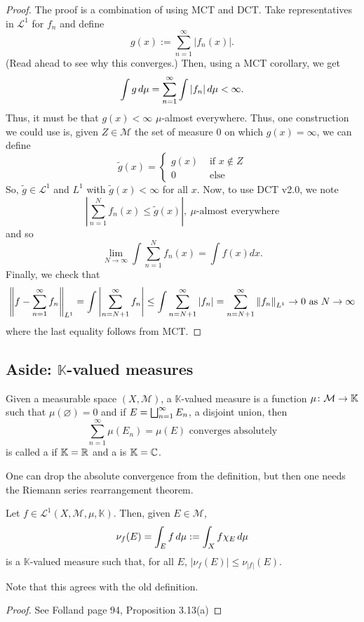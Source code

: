 \documentclass[11pt,leqno,oneside]{amsbook}
\numberwithin{thm}{section}
\newcommand{\M}{\mathcal{M}}
\newcommand{\cL}{\mathcal{L}}
\newcommand{\K}{\mathbb{K}} %
\renewcommand{\emptyset}{\varnothing}
\begin{document}
\begin{proof}
  The proof is a combination of using MCT and DCT. Take representatives
  in \(\cL^1\) for \(f_n\) and define \[
    g(x) := \sum_{n=1}^\infty |f_n(x)|.
  \]
  (Read ahead to see why this converges.) Then, using a MCT corollary, we
  get \[
    \int g \d\mu = \sum_{n=1}^\infty \int |f_n| \d\mu < \infty.
  \]
  Thus, it must be that \(g(x) < \infty\) \(\mu\)-almost everywhere.
  Thus, one construction we could use is, given \(Z \in \M\) the set
  of measure 0 on which \(g(x) = \infty\), we can define \[
    \tilde{g}(x) =
    \begin{cases}
      g(x) & \text{ if } x \not\in Z \\
      0 & \text{ else }
    \end{cases}
  \]
  So, \(\tilde{g} \in \cL^1\) and \(L^1\) with \(\tilde{g}(x) <
  \infty\) for all \(x\). Now, to use DCT v2.0, we note \[
    \left| \sum_{n=1}^N f_n(x) \leq \tilde{g}(x) \right|, \
    \mu\text{-almost everywhere}
  \]
  and so \[
    \lim_{N \to \infty} \int \sum_{n=1}^N f_n(x) = \int f(x) dx.
  \]
  Finally, we check that \[
    \norm[f - \sum_{n=1}^\infty f_n]_{L^1} = \int \left|
      \sum_{n=N+1}^\infty f_n \right| \leq \int \sum_{n=N+1}^\infty
    |f_n| = \sum_{n=N+1}^\infty \norm[f_n]_{L^1} \to 0 \text{ as } N
    \to \infty
  \]
  where the last equality follows from MCT.
\end{proof}
\subsection{Aside: \(\K\)-valued measures}
\begin{defn}
  Given a measurable space \((X,\M)\), a \(\K\)-valued measure is a
  function \(\mu \from \M \to \K\) such that \(\mu(\emptyset) = 0\)
  and if \(E = \Dunion_{n=1}^\infty E_n\), a disjoint union, then \[
    \sum_{n=1}^\infty \mu(E_n) = \mu(E) \text{ converges absolutely}
  \]
  is called a  if \(\K=\R\) and a \de{complex
    measure} is \(\K=\C\).
\end{defn}
\begin{rmk}
  One can drop the absolute convergence from the definition, but then
  one needs the Riemann series rearrangement theorem.
\end{rmk}
\begin{prop}
  Let \(f \in \cL^1(X,\M,\mu,\K)\). Then, given \(E \in \M\), \[
    \nu_f(E) = \int_E f \d\mu := \int_X f \chi_E \d\mu
  \]
  is a \(\K\)-valued measure such that, for all \(E\), \(|\nu_f(E)|
  \leq \nu_{|f|}(E)\).
\end{prop}
Note that this agrees with the old definition.
\begin{proof}
  See Folland page 94, Proposition 3.13(a)
\end{proof}
\end{document}
